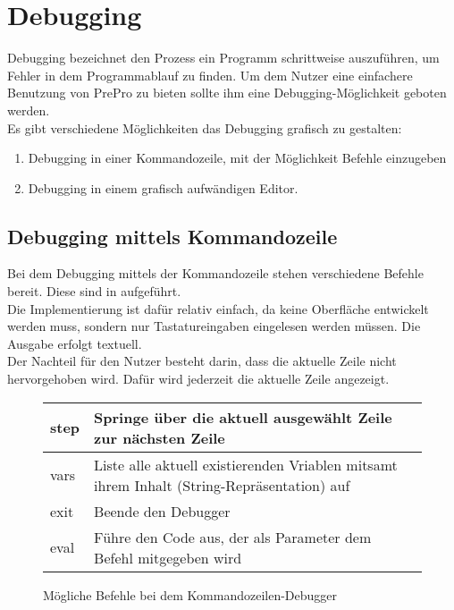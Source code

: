 \section{Debugging}
Debugging bezeichnet den Prozess ein Programm schrittweise auszuführen, um Fehler in dem Programmablauf zu finden.
Um dem Nutzer eine einfachere Benutzung von PrePro zu bieten sollte ihm eine Debugging-Möglichkeit geboten werden.\\
Es gibt verschiedene Möglichkeiten das Debugging grafisch zu gestalten:
\begin{enumerate}
\item Debugging in einer Kommandozeile, mit der Möglichkeit Befehle einzugeben
\item Debugging in einem grafisch aufwändigen Editor.
\end{enumerate}

\subsection{Debugging mittels Kommandozeile}
Bei dem Debugging mittels der Kommandozeile stehen verschiedene Befehle bereit.
Diese sind in  aufgeführt.\\
Die Implementierung ist dafür relativ einfach, da keine Oberfläche entwickelt werden muss, sondern nur Tastatureingaben eingelesen werden müssen.
Die Ausgabe erfolgt textuell.\\
Der Nachteil für den Nutzer besteht darin, dass die aktuelle Zeile nicht hervorgehoben wird.
Dafür wird jederzeit die aktuelle Zeile angezeigt.

\begin{figure}
	\centering
	\begin{tabular}{| m{4cm} | m{9cm} |}
	\hline
	step & Springe über die aktuell ausgewählt Zeile zur nächsten Zeile \\ \hline
	vars & Liste alle aktuell existierenden Vriablen mitsamt ihrem Inhalt (String-Repräsentation) auf \\ \hline
	exit & Beende den Debugger \\ \hline
	eval & Führe den Code aus, der als Parameter dem Befehl mitgegeben wird \\ \hline
	\end{tabular}
	\caption{Mögliche Befehle bei dem Kommandozeilen-Debugger}
	\label{fig:Commands_CLI_Debugger}
\end{figure}

\label{sec:Debugging_graphical}
